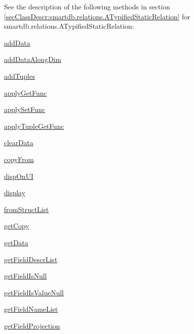 See the description of the following methods in section \ref{secClassDescr:smartdb.relations.ATypifiedStaticRelation}
 for smartdb.relations.ATypifiedStaticRelation:

\begin{list}{}{}
 \item \hyperref[method:smartdb.relations.ATypifiedStaticRelation.addData]{addData}
 \item \hyperref[method:smartdb.relations.ATypifiedStaticRelation.addDataAlongDim]{addDataAlongDim}
 \item \hyperref[method:smartdb.relations.ATypifiedStaticRelation.addTuples]{addTuples}
 \item \hyperref[method:smartdb.relations.ATypifiedStaticRelation.applyGetFunc]{applyGetFunc}
 \item \hyperref[method:smartdb.relations.ATypifiedStaticRelation.applySetFunc]{applySetFunc}
 \item \hyperref[method:smartdb.relations.ATypifiedStaticRelation.applyTupleGetFunc]{applyTupleGetFunc}
 \item \hyperref[method:smartdb.relations.ATypifiedStaticRelation.clearData]{clearData}
 \item \hyperref[method:smartdb.relations.ATypifiedStaticRelation.copyFrom]{copyFrom}
 \item \hyperref[method:smartdb.relations.ATypifiedStaticRelation.dispOnUI]{dispOnUI}
 \item \hyperref[method:smartdb.relations.ATypifiedStaticRelation.display]{display}
 \item \hyperref[method:smartdb.relations.ATypifiedStaticRelation.fromStructList]{fromStructList}
 \item \hyperref[method:smartdb.relations.ATypifiedStaticRelation.getCopy]{getCopy}
 \item \hyperref[method:smartdb.relations.ATypifiedStaticRelation.getData]{getData}
 \item \hyperref[method:smartdb.relations.ATypifiedStaticRelation.getFieldDescrList]{getFieldDescrList}
 \item \hyperref[method:smartdb.relations.ATypifiedStaticRelation.getFieldIsNull]{getFieldIsNull}
 \item \hyperref[method:smartdb.relations.ATypifiedStaticRelation.getFieldIsValueNull]{getFieldIsValueNull}
 \item \hyperref[method:smartdb.relations.ATypifiedStaticRelation.getFieldNameList]{getFieldNameList}
 \item \hyperref[method:smartdb.relations.ATypifiedStaticRelation.getFieldProjection]{getFieldProjection}

\end{list}
